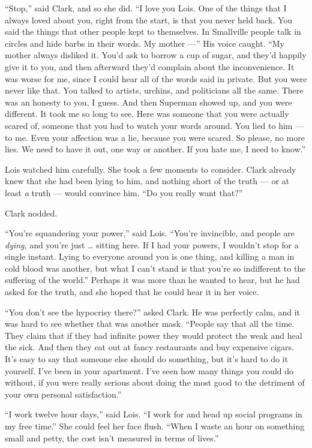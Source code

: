 ``Stop,'' said Clark, and so she did. ``I love you Lois. One of the
things that I always loved about you, right from the start, is that you
never held back. You said the things that other people kept to
themselves. In Smallville people talk in circles and hide barbs in their
words. My mother ---'' His voice caught. ``My mother always disliked it.
You'd ask to borrow a cup of sugar, and they'd happily give it to you,
and then afterward they'd complain about the inconvenience. It was worse
for me, since I could hear all of the words said in private. But you
were never like that. You talked to artists, urchins, and politicians
all the same. There was an honesty to you, I guess. And then Superman
showed up, and you were different. It took me so long to see. Here was
someone that you were actually scared of, someone that you had to watch
your words around. You lied to him --- to me. Even your affection was a
lie, because you were scared. So please, no more lies. We need to have
it out, one way or another. If you hate me, I need to know.''

Lois watched him carefully. She took a few moments to consider. Clark
already knew that she had been lying to him, and nothing short of the
truth --- or at least \emph{a} truth --- would convince him. ``Do you
really want that?''

Clark nodded.

``You're squandering your power,'' said Lois. ``You're invincible, and
people are \emph{dying}, and you're just \ldots{} sitting here. If I had
your powers, I wouldn't stop for a single instant. Lying to everyone
around you is one thing, and killing a man in cold blood was another,
but what I can't stand is that you're so indifferent to the suffering of
the world.'' Perhaps it was more than he wanted to hear, but he had
asked for the truth, and she hoped that he could hear it in her voice.

``You don't see the hypocrisy there?'' asked Clark. He was perfectly
calm, and it was hard to see whether that was another mask. ``People say
that all the time. They claim that if they had infinite power they would
protect the weak and heal the sick. And then they eat out at fancy
restaurants and buy expensive cigars. It's easy to say that someone else
should do something, but it's hard to do it yourself. I've been in your
apartment. I've seen how many things you could do without, if you were
really serious about doing the most good to the detriment of your own
personal satisfaction.''

``I work twelve hour days,'' said Lois. ``I work for and head up social
programs in my free time.'' She could feel her face flush. ``When I
waste an hour on something small and petty, the cost isn't measured in
terms of lives.''

